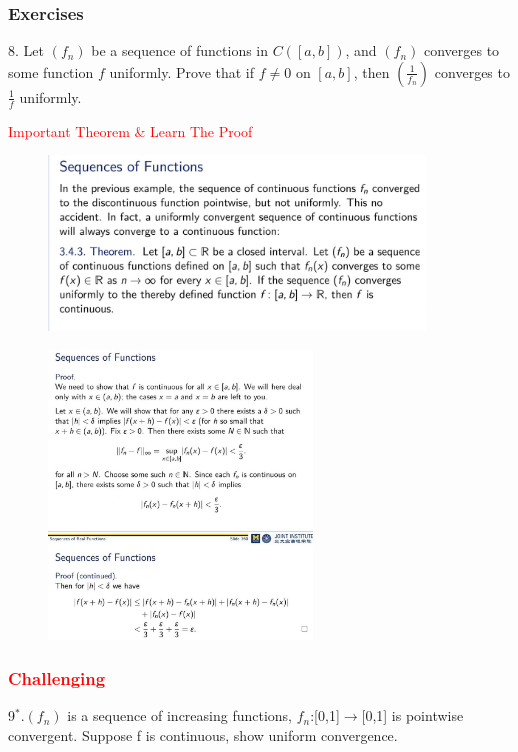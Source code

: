 \documentclass{beamer}
\begin{document}
\begin{frame}
    \frametitle{Exercises}
    8. Let $(f_n)$ be a sequence of functions in $C([a,b])$,
    and $(f_n)$ converges to some function $f$ uniformly.
    Prove that if $f\neq 0$ on $[a,b]$, then $(\frac{1}{f_n} )$ converges to $\frac{1}{f}$ uniformly.
\end{frame}

\begin{frame}
    \textcolor{red}{Important Theorem \& Learn The Proof}
    \begin{figure}[htbp]
        \centering
        \includegraphics[width=10cm]{important1.jpg}
    \end{figure}
\end{frame}

\begin{frame}
    \begin{figure}[htbp]
        \centering
        \includegraphics[width=7cm]{important2.jpg}
    \end{figure}
\end{frame}

\begin{frame}
    \frametitle{\textcolor{red}{Challenging}}
    9$^*$.$(f_{n})$ is a sequence of increasing functions, $f_{n}$:[0,1]$\rightarrow$[0,1] is pointwise convergent.
    Suppose f is continuous, show uniform convergence.
\end{frame}
\end{document}
